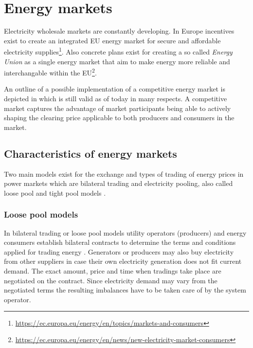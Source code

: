 

\section{Energy markets}


Electricity wholesale markets are constantly developing. In Europe incentives exist to create an integrated EU energy market for secure and affordable electricity supplies\footnote{\url{https://ec.europa.eu/energy/en/topics/markets-and-consumers}}. Also concrete plans exist for creating a so called \emph{Energy Union} as a single energy market that aim to make energy more reliable and interchangable within the EU\footnote{\url{https://ec.europa.eu/energy/en/news/new-electricity-market-consumers}}. 

An outline of a possible implementation of a competitive energy market is depicted in \cite{hogan1993competitive} which is still valid as of today in many respects. A competitive market captures the advantage of market participants being able to actively shaping the clearing price applicable to both producers and consumers in the market. 




\subsection{Characteristics of energy markets}

Two main models exist for the exchange and types of trading of energy prices in power markets which are bilateral trading and electricity pooling, also called loose pool and tight pool models \cite{onaiwu2009does,hogan1997reshaping,barroso2005classification,reston2012short}.

\subsubsection{Loose pool models}

In bilateral trading or loose pool models utility operators (producers) and energy consumers establish bilateral contracts to determine the terms and conditions applied for trading energy \cite{onaiwu2009does,kalverboer2001electricity}. Generators or producers may also buy electricity from other suppliers in case their own electricity generation does not fit current demand. The exact amount, price and time when tradings take place are negotiated on the contract. Since electricity demand may vary from the negotiated terms the resulting imbalances have to be taken care of by the system operator. 


